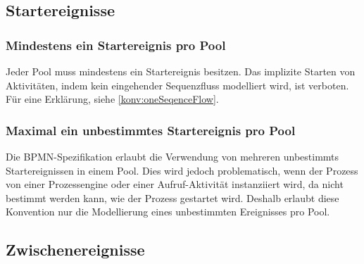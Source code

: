 \documentclass[12pt,report]{snetTeaching}
\begin{document}
\begin{Rahmen}
	\hfill
\end{Rahmen}












\clearpage
\subsection{Startereignisse}

\subsubsection{Mindestens ein Startereignis pro Pool}
\label{konv:oneStartEvent}

Jeder Pool muss mindestens ein Startereignis besitzen. Das implizite Starten von Aktivitäten, indem kein eingehender Sequenzfluss modelliert wird, ist verboten. Für eine Erklärung, siehe \ref{konv:oneSeqenceFlow}.


\begin{Rahmen}
	\hfill
\end{Rahmen}



\subsubsection{Maximal ein unbestimmtes Startereignis pro Pool}

Die BPMN-Spezifikation erlaubt die Verwendung von mehreren \glspl{unbestimmt} Startereignissen in einem Pool. Dies wird jedoch problematisch, wenn der Prozess von einer Prozessengine oder einer Aufruf-Aktivität instanziiert wird, da nicht bestimmt werden kann, wie der Prozess gestartet wird. Deshalb erlaubt diese Konvention nur die Modellierung eines unbestimmten Ereignisses pro Pool.

\begin{Rahmen}
	\hfill
\end{Rahmen}


\clearpage
\subsection{Zwischenereignisse}
\end{document}
